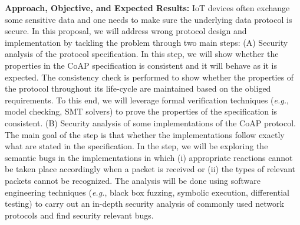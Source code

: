 \documentclass[10pt,onecolumn]{article}
\newcommand{\eg}{\textit{e.g.}\xspace}
\begin{document}
\noindent\textbf{Approach, Objective, and Expected Results:} IoT devices often exchange some sensitive data and one needs to make sure the underlying data protocol is secure. In this proposal, we will address wrong protocol design and implementation by tackling the problem through two main steps: (A) Security analysis of the protocol specification. In this step, we will show whether the properties in the CoAP specification is consistent and it will behave as it is expected. The consistency check is performed to show whether the properties of the protocol throughout its life-cycle are maintained based on the obliged requirements. To this end, we will leverage formal verification techniques (\eg, model checking, SMT solvers) to prove the properties of the specification is consistent. (B) Security analysis of some implementations of the CoAP protocol. The main goal of the step is that whether the implementations follow exactly what are stated in the specification. In the step, we will be exploring the semantic bugs in the implementations in which (i) appropriate reactions cannot be taken place accordingly when a packet is received or (ii) the types of relevant packets cannot be recognized. The analysis will be done using software engineering techniques (\eg, black box fuzzing, symbolic execution, differential testing) to carry out an in-depth security analysis of commonly used network protocols and find security relevant bugs. 


%
%
\end{document}
